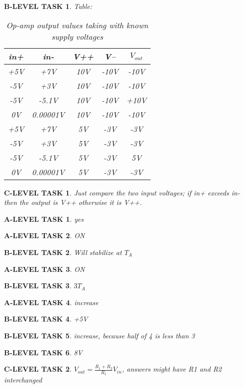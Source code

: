 \documentclass{book}
\numberwithin{equation}{section}
\newtheorem{alevel}{A-LEVEL TASK}
\newtheorem{blevel}{B-LEVEL TASK}
\newtheorem{clevel}{C-LEVEL TASK}
\theoremstyle{definition}
\begin{document}
\begin{blevel} Table:\par
\begin{table}[H]
\begin{center}
\begin{tabular}{|c|c|c|c|c|}\hline
in+&in-&V++&V--&$V_{out}$\\ \hline
+5V&+7V&10V&-10V&-10V \\ \hline
-5V&+3V&10V&-10V& -10V\\ \hline
-5V&-5.1V&10V&-10V& +10V\\ \hline
0V&0.00001V&10V&-10V& -10V\\ \hline
+5V&+7V&5V&-3V& -3V\\ \hline
-5V&+3V&5V&-3V& -3V\\ \hline
-5V&-5.1V&5V&-3V& 5V\\ \hline
0V&0.00001V&5V&-3V& -3V\\ \hline
\end{tabular}
\caption{Op-amp output values taking with known supply voltages}
\label{T:5OP2}
\end{center}
\end{table}
\end{blevel}

\begin{clevel}Just compare the two input voltages; if in+ exceeds in- then the output is V++ otherwise it is V++.\end{clevel}

\begin{alevel}yes\end{alevel}
\begin{alevel}ON\end{alevel}
\begin{blevel}Will stabilize at $T_A$\end{blevel}
\begin{alevel}ON\end{alevel}
\begin{blevel}$3T_A$\end{blevel}
\begin{alevel}increase\end{alevel}
\begin{blevel}+5V\end{blevel}

\begin{blevel}increase, because half of 4 is less than 3\end{blevel}
\begin{blevel}8V\end{blevel}
\begin{clevel}$V_{out}=\frac{R_1+R_2}{R_1}V_{in}$, answers might have R1 and R2 interchanged\end{clevel}
\end{document}
